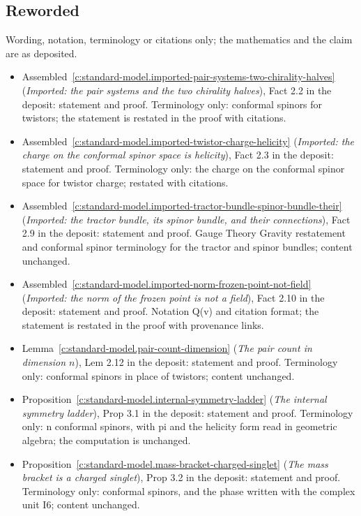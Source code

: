 \documentclass[11pt]{article}
\theoremstyle{definition}
\theoremstyle{plain}
\begin{document}
\subsection*{Reworded}
Wording, notation, terminology or citations only; the mathematics and the claim are as deposited.
\begin{itemize}\setlength{\itemsep}{2pt}
\item Assembled~\ref{c:standard-model.imported-pair-systems-two-chirality-halves} (\emph{Imported: the pair systems and the two chirality halves}), Fact 2.2 in the deposit: statement and proof. Terminology only: conformal spinors for twistors; the statement is restated in the proof with citations.
\item Assembled~\ref{c:standard-model.imported-twistor-charge-helicity} (\emph{Imported: the charge on the conformal spinor space is helicity}), Fact 2.3 in the deposit: statement and proof. Terminology only: the charge on the conformal spinor space for twistor charge; restated with citations.
\item Assembled~\ref{c:standard-model.imported-tractor-bundle-spinor-bundle-their} (\emph{Imported: the tractor bundle, its spinor bundle, and their connections}), Fact 2.9 in the deposit: statement and proof. Gauge Theory Gravity restatement and conformal spinor terminology for the tractor and spinor bundles; content unchanged.
\item Assembled~\ref{c:standard-model.imported-norm-frozen-point-not-field} (\emph{Imported: the norm of the frozen point is not a field}), Fact 2.10 in the deposit: statement and proof. Notation Q(v) and citation format; the statement is restated in the proof with provenance links.
\item Lemma~\ref{c:standard-model.pair-count-dimension} (\emph{The pair count in dimension $n$}), Lem 2.12 in the deposit: statement and proof. Terminology only: conformal spinors in place of twistors; content unchanged.
\item Proposition~\ref{c:standard-model.internal-symmetry-ladder} (\emph{The internal symmetry ladder}), Prop 3.1 in the deposit: statement and proof. Terminology only: n conformal spinors, with pi and the helicity form read in geometric algebra; the computation is unchanged.
\item Proposition~\ref{c:standard-model.mass-bracket-charged-singlet} (\emph{The mass bracket is a charged singlet}), Prop 3.2 in the deposit: statement and proof. Terminology only: conformal spinors, and the phase written with the complex unit I6; content unchanged.

\end{itemize}
\end{document}
